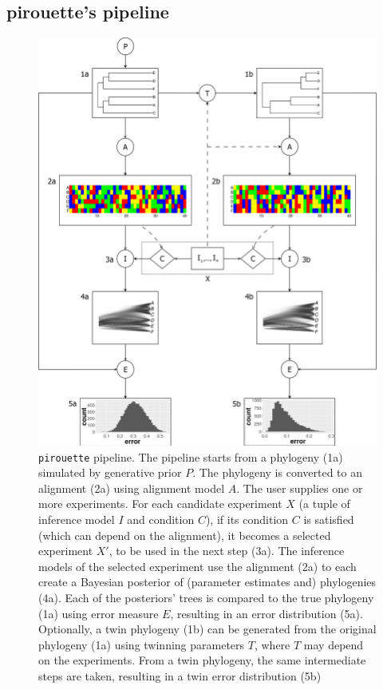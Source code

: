 \documentclass{article}
\begin{document}
\subsection{pirouette's pipeline}
\label{subsec:pipeline}

\begin{figure}
  \centering
  \includegraphics[width=\textwidth]{workflow_alt.png}
  \caption{
    \texttt{pirouette} pipeline.
    The pipeline starts from a phylogeny (1a) simulated by generative prior 
    $\mathit{P}$.
    The phylogeny is converted to an alignment (2a) using alignment model 
    $\mathit{A}$. 
    The user supplies one or more experiments.
    For each candidate experiment $\mathit{X}$ 
    (a tuple of inference model $\mathit{I}$ and condition $\mathit{C}$),
    if its condition $\mathit{C}$ is 
    satisfied (which can depend on the alignment), 
    it becomes a selected experiment $\mathit{X'}$, 
    to be used in the next step (3a).
    The inference models of the selected experiment use the alignment (2a) 
    to each create a Bayesian posterior of (parameter estimates and) 
    phylogenies (4a). 
    Each of the posteriors' trees is compared to the true phylogeny (1a) 
    using error measure $\mathit{E}$, 
    resulting in an error distribution (5a). 
    Optionally, a twin phylogeny (1b) can be generated from the original 
    phylogeny (1a) using twinning parameters $T$, where $T$ may depend on
    the experiments.
    From a twin phylogeny, the same intermediate steps are taken,
    resulting in a twin error distribution (5b)
  }
  \label{fig:pipeline}
\end{figure}
\end{document}

